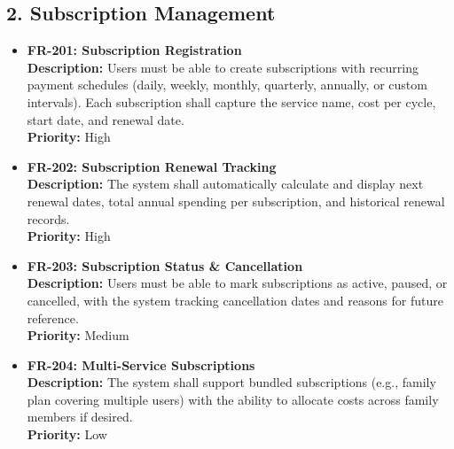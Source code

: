 \documentclass[11pt, a4paper]{article}
\newcommand{\reqid}[1]{\textbf{\color{PrimaryColor}#1}}
\begin{document}
	\subsection{2. Subscription Management}
	\begin{itemize}
		\item \reqid{FR-201: Subscription Registration} \\
		\textbf{Description:} Users must be able to create subscriptions with recurring payment schedules (daily, weekly, monthly, quarterly, annually, or custom intervals). Each subscription shall capture the service name, cost per cycle, start date, and renewal date. \\
		\textbf{Priority:} High
		
		\item \reqid{FR-202: Subscription Renewal Tracking} \\
		\textbf{Description:} The system shall automatically calculate and display next renewal dates, total annual spending per subscription, and historical renewal records. \\
		\textbf{Priority:} High
		
		\item \reqid{FR-203: Subscription Status \& Cancellation} \\
		\textbf{Description:} Users must be able to mark subscriptions as active, paused, or cancelled, with the system tracking cancellation dates and reasons for future reference. \\
		\textbf{Priority:} Medium
		
		\item \reqid{FR-204: Multi-Service Subscriptions} \\
		\textbf{Description:} The system shall support bundled subscriptions (e.g., family plan covering multiple users) with the ability to allocate costs across family members if desired. \\
		\textbf{Priority:} Low
	\end{itemize}
	
\end{document}

